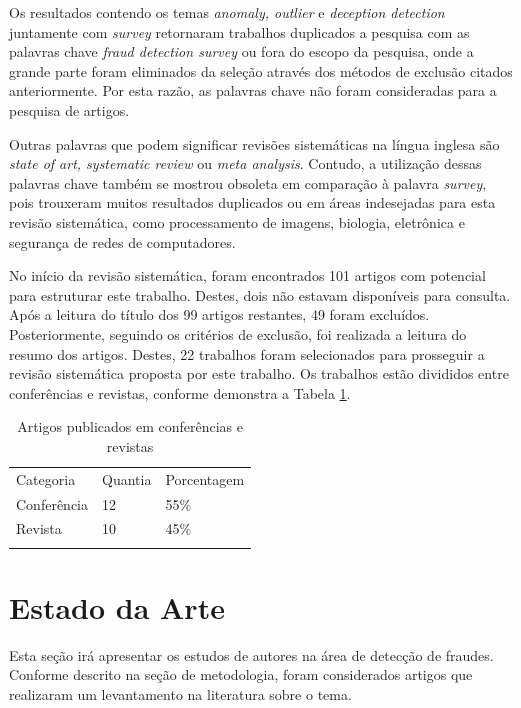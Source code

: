 \documentclass[smallextended]{svjour3}
\begin{document}
Os resultados contendo os temas \emph{anomaly, outlier} e \emph{deception detection} juntamente com \emph{survey} retornaram trabalhos duplicados a pesquisa com as palavras chave \emph{fraud detection survey} ou fora do escopo da pesquisa, onde a grande parte foram eliminados da seleção através dos métodos de exclusão citados anteriormente. Por esta razão, as palavras chave não foram consideradas para a pesquisa de artigos.

Outras palavras que podem significar revisões sistemáticas na língua inglesa são \emph{state of art, systematic review} ou \emph{meta analysis}. Contudo, a utilização dessas palavras chave também se mostrou obsoleta em comparação à palavra \emph{survey}, pois trouxeram muitos resultados duplicados ou em áreas indesejadas para esta revisão sistemática, como processamento de imagens, biologia, eletrônica e segurança de redes de computadores.

No início da revisão sistemática, foram encontrados 101 artigos com potencial para estruturar este trabalho. Destes, dois não estavam disponíveis para consulta. Após a leitura do título dos 99 artigos restantes, 49 foram excluídos. Posteriormente, seguindo os critérios de exclusão, foi realizada a leitura do resumo dos artigos. Destes, 22 trabalhos foram selecionados para prosseguir a revisão sistemática proposta por este trabalho. Os trabalhos estão divididos entre conferências e revistas, conforme demonstra a Tabela \ref{tab:conferenciasrevistas}.

\begin{table}
	\caption{Artigos publicados em conferências e revistas}
	\label{tab:conferenciasrevistas}       %
	\begin{tabular}[!Ht]{lll}
		\hline\noalign{\smallskip}
		Categoria & Quantia & Porcentagem  \\
		\noalign{\smallskip}\hline\noalign{\smallskip}
		Conferência & 12 & 55\% \\
		Revista & 10 & 45\% \\
		\noalign{\smallskip}\hline
	\end{tabular}
\end{table}

\section{Estado da Arte}
\label{sec:4}

Esta seção irá apresentar os estudos de autores na área de detecção de fraudes. Conforme descrito na seção de metodologia, foram considerados artigos que realizaram um levantamento na literatura sobre o tema.
\end{document}
